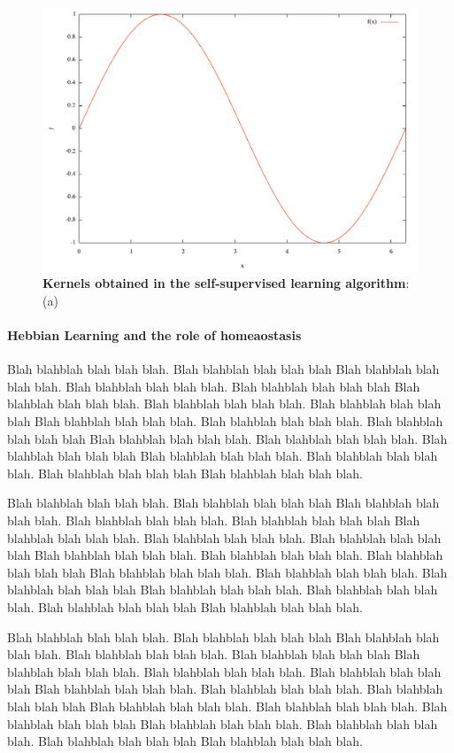 \documentclass[12pt]{article}
\begin{document}
\begin{figure}[!ht]%
\includegraphics[width=.99\linewidth, height=.3\linewidth]{figure1.pdf}
\caption
{
\textbf{Kernels obtained in the self-supervised learning algorithm}: (a) 
\label{fig:fig1}
}
\end{figure}

\paragraph*{Hebbian Learning and the role of homeaostasis}
Blah blahblah blah blah blah. Blah blahblah blah blah blah Blah blahblah blah blah blah.
Blah blahblah blah blah blah. Blah blahblah blah blah blah Blah blahblah blah blah blah.
Blah blahblah blah blah blah. Blah blahblah blah blah blah Blah blahblah blah blah blah.
Blah blahblah blah blah blah. Blah blahblah blah blah blah Blah blahblah blah blah blah.
Blah blahblah blah blah blah. Blah blahblah blah blah blah Blah blahblah blah blah blah.
Blah blahblah blah blah blah. Blah blahblah blah blah blah Blah blahblah blah blah blah.

Blah blahblah blah blah blah. Blah blahblah blah blah blah Blah blahblah blah blah blah.
Blah blahblah blah blah blah. Blah blahblah blah blah blah Blah blahblah blah blah blah.
Blah blahblah blah blah blah. Blah blahblah blah blah blah Blah blahblah blah blah blah.
Blah blahblah blah blah blah. Blah blahblah blah blah blah Blah blahblah blah blah blah.
Blah blahblah blah blah blah. Blah blahblah blah blah blah Blah blahblah blah blah blah.
Blah blahblah blah blah blah. Blah blahblah blah blah blah Blah blahblah blah blah blah.

Blah blahblah blah blah blah. Blah blahblah blah blah blah Blah blahblah blah blah blah.
Blah blahblah blah blah blah. Blah blahblah blah blah blah Blah blahblah blah blah blah.
Blah blahblah blah blah blah. Blah blahblah blah blah blah Blah blahblah blah blah blah.
Blah blahblah blah blah blah. Blah blahblah blah blah blah Blah blahblah blah blah blah.
Blah blahblah blah blah blah. Blah blahblah blah blah blah Blah blahblah blah blah blah.
Blah blahblah blah blah blah. Blah blahblah blah blah blah Blah blahblah blah blah blah.
\end{document}
